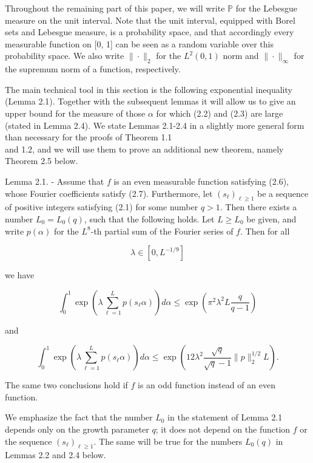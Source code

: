 \documentclass[10pt]{article}
\newcommand{\1}{\mathbf{1}}
\begin{document}
Throughout the remaining part of this paper, we will write $\mathbb{P}$ for the Lebesgue measure on the unit interval. Note that the unit interval, equipped with Borel sets and Lebesgue measure, is a probability space, and that accordingly every measurable function on [0, 1] can be seen as a random variable over this probability space. We also write $\|\cdot\|_{2}$ for the $L^{2}(0,1)$ norm and $\|\cdot\|_{\infty}$ for the supremum norm of a function, respectively.

The main technical tool in this section is the following exponential inequality (Lemma 2.1). Together with the subsequent lemmas it will allow us to give an upper bound for the measure of those $\alpha$ for which (2.2) and (2.3) are large (stated in Lemma 2.4). We state Lemmas 2.1-2.4 in a slightly more general form than necessary for the proofs of Theorem 1.1\\
and 1.2, and we will use them to prove an additional new theorem, namely Theorem 2.5 below.

Lemma 2.1. - Assume that $f$ is an even measurable function satisfying (2.6), whose Fourier coefficients satisfy (2.7). Furthermore, let $\left(s_{\ell}\right)_{\ell \geqslant 1}$ be a sequence of positive integers satisfying (2.1) for some number $q>1$. Then there exists a number $L_{0}=L_{0}(q)$, such that the following holds. Let $L \geqslant L_{0}$ be given, and write $p(\alpha)$ for the $L^{8}$-th partial sum of the Fourier series of $f$. Then for all


\begin{equation*}
\lambda \in\left[0, L^{-1 / 9}\right] \tag{2.8}
\end{equation*}


we have

$$
\int_{0}^{1} \exp \left(\lambda \sum_{\ell=1}^{L} p\left(s_{\ell} \alpha\right)\right) d \alpha \leqslant \exp\left(\pi^2\lambda^2L\frac{q}{q-1}\right)
$$

and

$$
\int_{0}^{1} \exp \left(\lambda \sum_{\ell=1}^{L} p\left(s_{\ell} \alpha\right)\right) d \alpha \leqslant \exp \left(12 \lambda^{2} \frac{\sqrt{q}}{\sqrt{q}-1}\|p\|_{2}^{1 / 2} L\right) .
$$

The same two conclusions hold if $f$ is an odd function instead of an even function.

We emphasize the fact that the number $L_{0}$ in the statement of Lemma 2.1 depends only on the growth parameter $q$; it does not depend on the function $f$ or the sequence $\left(s_{\ell}\right)_{\ell \geqslant 1}$. The same will be true for the numbers $L_{0}(q)$ in Lemmas 2.2 and 2.4 below.
\end{document}
